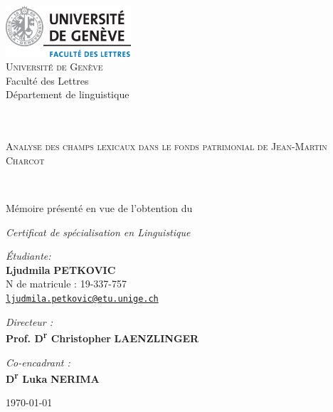 \begin{titlepage}
\begin{center}

\includegraphics[width=0.35\textwidth]{img/unige_lettres_logo.png}~\\[1cm]

\large \textsc{Université de Genève}\\Faculté des Lettres\\
Département de linguistique

\textsc{\Large }\\[0.5cm]

\HRule \\[0.3cm]

{\LARGE \textsc{Analyse des champs lexicaux dans le fonds patrimonial de Jean-Martin Charcot} \\[0.4cm] }

\HRule \\[1.4cm]
\normalsize{Mémoire présenté en vue de l'obtention du\medskip

\large \textit{Certificat de spécialisation en Linguistique}\vspace{2cm}}

\begin{minipage}{1\textwidth}
\begin{flushleft} \normalsize
\emph{Étudiante:}\\
\textbf{Ljudmila} \textsc{\textbf{PETKOVIC}}\\
\small{N\textdegree{} de matricule : 19-337-757\\\href{mailto:ljudmila.petkovic@etu.unige.ch}{\texttt{ljudmila.petkovic@etu.unige.ch}}}
\end{flushleft}
\end{minipage}
\begin{minipage}{1\textwidth}
\begin{flushright} \normalsize
\emph{Directeur :} \\
\textbf{Prof. D\textsuperscript{r} Christopher} \textsc{\textbf{LAENZLINGER}}

\medskip
\emph{Co-encadrant :} \\
\textbf{D\textsuperscript{r} Luka} \textsc{\textbf{NERIMA}}
\end{flushright}
\end{minipage}

\vfill

{\normalsize \today}

\end{center}
\end{titlepage}